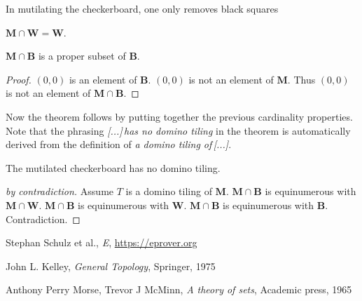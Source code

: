 \documentclass{article}
\newcommand{\Mutilated}{\mathbf{M}}
\newcommand{\Black}{\mathbf{B}}
\newcommand{\White}{\mathbf{W}}
\begin{document}
\noindent In mutilating the checkerboard, one only removes black squares

\begin{forthel}
  \begin{lemma}
      $\Mutilated \cap \White = \White$.
  \end{lemma}

\begin{lemma}
    $\Mutilated\cap\Black$ is a proper subset of $\Black$.
\end{lemma}
\begin{proof}
    $(0,0)$ is an element of $\Black$.
    $(0,0)$ is not an element of $\Mutilated$.
    Thus $(0,0)$ is not an element of $\Mutilated\cap \Black$.
\end{proof}
\end{forthel}

\noindent Now the theorem follows by putting together the previous cardinality properties.
Note that the phrasing \textit{[...]\,has no domino tiling} in the theorem is automatically
derived from the definition of \textit{a domino tiling of\,[...]}.

\begin{forthel}
    \begin{theorem}
        The mutilated checkerboard has no domino tiling.
    \end{theorem}
    \begin{proof}[by contradiction]
        Assume $T$ is a domino tiling of $\Mutilated$.
        $\Mutilated \cap \Black$ is equinumerous with $\Mutilated \cap \White$.
        $\Mutilated \cap \Black$ is equinumerous with $\White$.
        $\Mutilated \cap \Black$ is equinumerous with $\Black$.
        Contradiction.
    \end{proof}
\end{forthel}

\begin{thebibliography}{1}

 Stephan Schulz et al., \textit{E}, \url{https://eprover.org}

 John L. Kelley, \textit{General Topology}, Springer, 1975

 Anthony Perry Morse, Trevor J McMinn, \textit{A theory of sets}, Academic press, 1965

\end{thebibliography}
\end{document}
